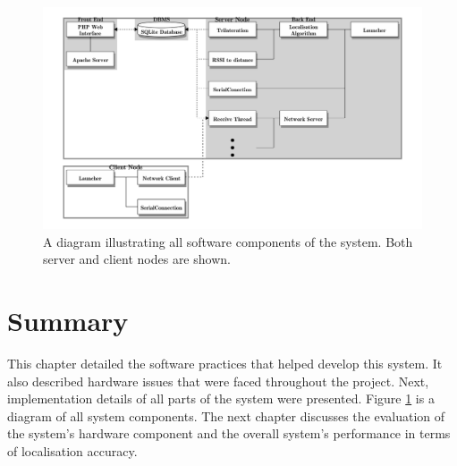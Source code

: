 \begin{figure}[h]
	\begin{center}
		\includegraphics[width=1\textwidth]{figures/blockdiag/system}
		\caption{A diagram illustrating all software components of the system. Both server and client nodes are shown.}
		\label{fig:sys}
	\end{center}
\end{figure}

\section{Summary}

This chapter detailed the software practices that helped develop this system. It also described hardware issues that were faced throughout the project. Next, implementation details of all parts of the system were presented. Figure \ref{fig:sys} is a diagram of all system components. The next chapter discusses the evaluation of the system's hardware component and the overall system's performance in terms of localisation accuracy.
